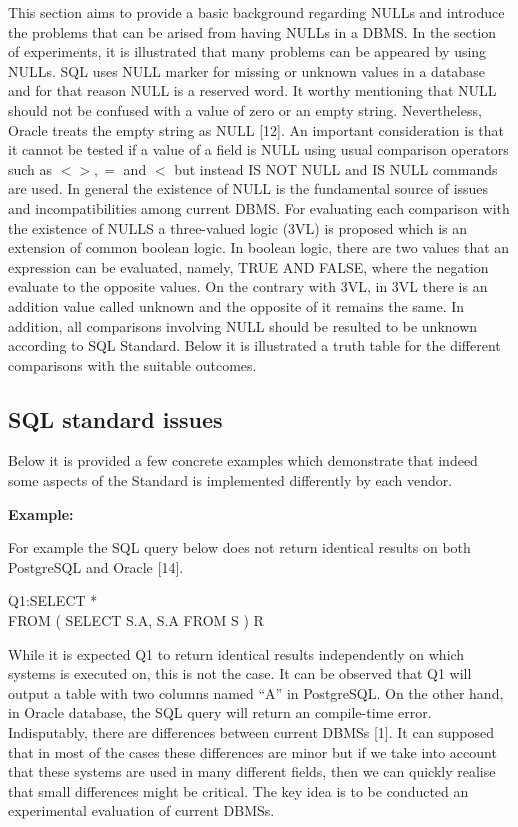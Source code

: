 This section aims to provide a basic background regarding NULLs and introduce the problems that can be arised from having NULLs in a DBMS. In the section of experiments, it is illustrated that many problems can be appeared by using NULLs. SQL uses NULL marker for missing or unknown values in a database and for that reason NULL is a reserved word. It worthy mentioning that NULL should not be confused with a value of zero or an empty string. Nevertheless, Oracle treats the empty string as NULL [12].  An important consideration is that it cannot be tested if a value of a field is NULL using usual comparison operators such as $ <>, = $ and $<$ but instead IS NOT NULL and IS NULL commands are used. In general the existence of NULL is the fundamental source of issues and incompatibilities among current DBMS. For evaluating each comparison with the existence of NULLS a three-valued logic (3VL) is proposed which is an extension of common boolean logic. In boolean logic, there are two values that an expression can be evaluated, namely, TRUE AND FALSE, where the negation evaluate to the opposite values. On the contrary with 3VL, in 3VL there is an addition value called unknown and the opposite of it remains the same. In addition, all comparisons involving NULL should be resulted to be unknown according to SQL Standard. Below it is illustrated a truth table for the different comparisons with the suitable outcomes.    

\subsection{SQL standard issues} 

Below it is provided a few concrete examples which demonstrate that indeed some aspects of the Standard is implemented differently by each vendor. 
 
\textbf{Example:}

For example the SQL query below does not return identical results on both PostgreSQL and Oracle [14]. 


\begin{mdframed}[backgroundcolor=gray!20][h] 
Q1:SELECT * 
 \\FROM ( SELECT S.A, S.A FROM S ) R
\end{mdframed}

While it is expected Q1 to return identical results independently on which systems is executed on, this is not the case. It can be observed that Q1 will output a table with two columns named “A” in PostgreSQL. On the other hand, in Oracle database, the SQL query will return an compile-time error. Ιndisputably, there are differences between current DBMSs [1]. 
It can supposed that in most of the cases these differences are minor but if we take into account that these systems are used in many different fields, then we can quickly realise that small differences might be critical. The key idea is to be conducted an experimental evaluation of current DBMSs. 




